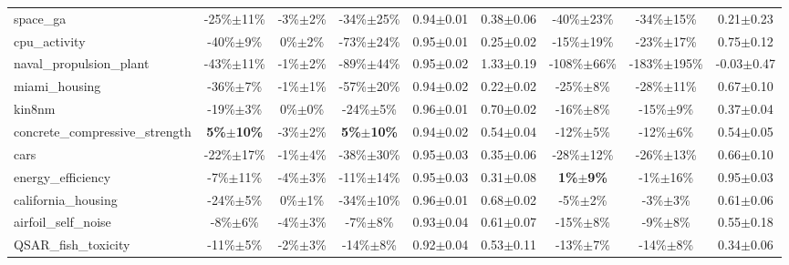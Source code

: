 \begin{table}[t]
\begin{small}
\begin{sc}
{\begin{tabular}{lcccccccc}
space\_ga  &  -25\%$\pm$11\%  &  -3\%$\pm$2\%  &  -34\%$\pm$25\%  &  0.94$\pm$0.01  &  0.38$\pm$0.06  &  -40\%$\pm$23\%  &  -34\%$\pm$15\%  &  0.21$\pm$0.23 \\
cpu\_activity  &  -40\%$\pm$9\%  &  0\%$\pm$2\%  &  -73\%$\pm$24\%  &  0.95$\pm$0.01  &  0.25$\pm$0.02  &  -15\%$\pm$19\%  &  -23\%$\pm$17\%  &  0.75$\pm$0.12 \\
naval\_propulsion\_plant  &  -43\%$\pm$11\%  &  -1\%$\pm$2\%  &  -89\%$\pm$44\%  &  0.95$\pm$0.02  &  1.33$\pm$0.19  &  -108\%$\pm$66\%  &  -183\%$\pm$195\%  &  -0.03$\pm$0.47 \\
miami\_housing  &  -36\%$\pm$7\%  &  -1\%$\pm$1\%  &  -57\%$\pm$20\%  &  0.94$\pm$0.02  &  0.22$\pm$0.02  &  -25\%$\pm$8\%  &  -28\%$\pm$11\%  &  0.67$\pm$0.10 \\
kin8nm  &  -19\%$\pm$3\%  &  0\%$\pm$0\%  &  -24\%$\pm$5\%  &  0.96$\pm$0.01  &  0.70$\pm$0.02  &  -16\%$\pm$8\%  &  -15\%$\pm$9\%  &  0.37$\pm$0.04 \\
concrete\_compressive\_strength  &  \textbf{5\%$\pm$10\%}  &  -3\%$\pm$2\%  &  \textbf{5\%$\pm$10\%}  &  0.94$\pm$0.02  &  0.54$\pm$0.04  &  -12\%$\pm$5\%  &  -12\%$\pm$6\%  &  0.54$\pm$0.05 \\
cars  &  -22\%$\pm$17\%  &  -1\%$\pm$4\%  &  -38\%$\pm$30\%  &  0.95$\pm$0.03  &  0.35$\pm$0.06  &  -28\%$\pm$12\%  &  -26\%$\pm$13\%  &  0.66$\pm$0.10 \\
energy\_efficiency  &  -7\%$\pm$11\%  &  -4\%$\pm$3\%  &  -11\%$\pm$14\%  &  0.95$\pm$0.03  &  0.31$\pm$0.08  &  \textbf{1\%$\pm$9\%}  &  -1\%$\pm$16\%  &  0.95$\pm$0.03 \\
california\_housing  &  -24\%$\pm$5\%  &  0\%$\pm$1\%  &  -34\%$\pm$10\%  &  0.96$\pm$0.01  &  0.68$\pm$0.02  &  -5\%$\pm$2\%  &  -3\%$\pm$3\%  &  0.61$\pm$0.06 \\
airfoil\_self\_noise  &  -8\%$\pm$6\%  &  -4\%$\pm$3\%  &  -7\%$\pm$8\%  &  0.93$\pm$0.04  &  0.61$\pm$0.07  &  -15\%$\pm$8\%  &  -9\%$\pm$8\%  &  0.55$\pm$0.18 \\
QSAR\_fish\_toxicity  &  -11\%$\pm$5\%  &  -2\%$\pm$3\%  &  -14\%$\pm$8\%  &  0.92$\pm$0.04  &  0.53$\pm$0.11  &  -13\%$\pm$7\%  &  -14\%$\pm$8\%  &  0.34$\pm$0.06 \\

\bottomrule
\end{tabular}
}
\end{sc}
\end{small}
\end{table}
